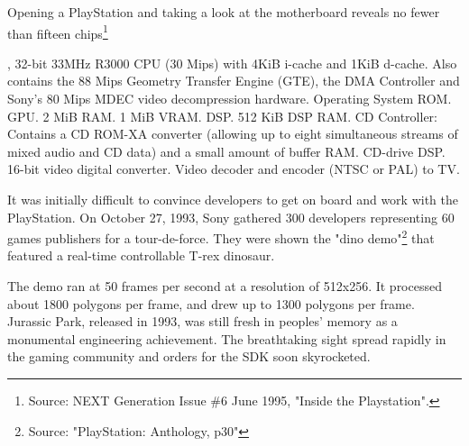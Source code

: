 \par
\vspace{15pt}
Opening a PlayStation and taking a look at the motherboard reveals no fewer than fifteen chips\footnote{Source: NEXT Generation Issue \#6 June 1995, "Inside the Playstation".}\\
\par
{}, 32-bit 33MHz R3000 CPU (30 Mips) with  4KiB i-cache and 1KiB d-cache. Also contains the 88 Mips Geometry Transfer Engine (GTE), the DMA Controller and Sony's 80 Mips MDEC video decompression hardware.
 Operating System ROM.
 GPU.
 2 MiB RAM.
 1 MiB VRAM.
 DSP.
 512 KiB DSP RAM.
 CD Controller: Contains a CD ROM-XA converter (allowing up to eight simultaneous streams of mixed audio and CD data) and a small amount of buffer RAM.
 CD-drive DSP.
 16-bit video digital converter.
 Video decoder and encoder (NTSC or PAL) to TV.


\par
\begin{figure}{
\centering {}}
\end{figure}
It was initially difficult to convince developers to get on board and work with the PlayStation. On October 27, 1993, Sony gathered 300 developers representing 60 games publishers for a tour-de-force. They were shown the "dino demo"\footnote{Source: "PlayStation: Anthology, p30"} that featured a real-time controllable T-rex dinosaur.\\
\par The demo ran at 50 frames per second at a resolution of 512x256. It processed about 1800 polygons per frame, and drew up to 1300 polygons per frame. Jurassic Park, released in 1993, was still fresh in peoples' memory as a monumental engineering achievement. The breathtaking sight spread rapidly in the gaming community and orders for the SDK soon skyrocketed.
 
 






